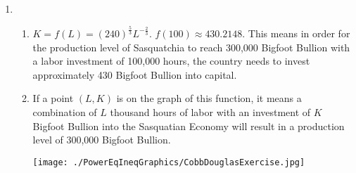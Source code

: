 \documentclass{ximera}
\begin{document}
\begin{enumerate}
\setcounter{enumi}{\value{HW}}
\item \begin{enumerate}

\item $K=f(L) = (240)^{ \frac{5}{3}} L^{- \frac{2}{3}}$.  $f(100)  \approx 430.2148$.  This means in order for the production level of Sasquatchia to reach 300,000 Bigfoot Bullion with a labor investment of 100,000 hours, the country needs to invest approximately 430 Bigfoot Bullion into capital.


\item If a point $(L,K)$ is on the graph of this function, it means a combination of $L$ thousand hours of labor with an investment of $K$ Bigfoot Bullion into the Sasquatian Economy will result in a production level of 300,000 Bigfoot Bullion.

\centerline{\texttt{[image: ./PowerEqIneqGraphics/CobbDouglasExercise.jpg]}}



\end{enumerate}

\end{enumerate}
\end{document}
